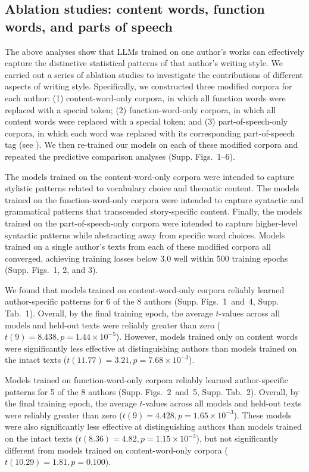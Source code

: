 \documentclass{llmxive}
\providecommand{\crossentropyContent}{{1}}
\providecommand{\crossentropyFunction}{{2}}
\providecommand{\crossentropyPOS}{{3}}
\providecommand{\ttestsContent}{{4}}
\providecommand{\ttestsFunction}{{5}}
\providecommand{\ttestsPOS}{{6}}
\providecommand{\authortableContent}{{1}}
\providecommand{\authortableFunction}{{2}}
\begin{document}
\subsection{Ablation studies: content words, function words, and parts of speech}

The above analyses show that LLMs trained on one author's works can effectively
capture the distinctive statistical patterns of that author's writing style. We
carried out a series of ablation studies to investigate the contributions of
different aspects of writing style. Specifically, we constructed three modified
corpora for each author: (1) content-word-only corpora, in which all function
words were replaced with a special token; (2) function-word-only corpora, in
which all content words were replaced with a special token; and (3)
part-of-speech-only corpora, in which each word was replaced with its
corresponding part-of-speech tag (see ). We then
re-trained our models on each of these modified corpora and repeated the
predictive comparison analyses (Supp. Figs.~\crossentropyContent--\ttestsPOS).

The models trained on the content-word-only corpora were intended to capture
stylistic patterns related to vocabulary choice and thematic content. The
models trained on the function-word-only corpora were intended to capture
syntactic and grammatical patterns that transcended story-specific content.
Finally, the models trained on the part-of-speech-only corpora were intended to
capture higher-level syntactic patterns while abstracting away from specific
word choices. Models trained on a single author's texts from each of these
modified corpora all converged, achieving training losses below 3.0 well within
500 training epochs (Supp. Figs.~\crossentropyContent, \crossentropyFunction,
and \crossentropyPOS).

We found that models trained on content-word-only corpora reliably learned
author-specific patterns for 6 of the 8 authors (Supp.
Figs.~\crossentropyContent~and~\ttestsContent, Supp.
Tab.~\authortableContent). Overall, by the final training epoch, the average
$t$-values across all models and held-out texts were reliably greater than zero
($t(9) = 8.438, p = 1.44 \times 10^{-5}$). However, models trained only on
content words were significantly less effective at distinguishing authors than
models trained on the intact texts ($t(11.77) = 3.21, p = 7.68 \times
10^{-3}$).

Models trained on function-word-only corpora reliably learned author-specific
patterns for 5 of the 8 authors (Supp.
Figs.~\crossentropyFunction~and~\ttestsFunction, Supp.
Tab.~\authortableFunction). Overall, by the final training epoch, the average
$t$-values across all models and held-out texts were reliably greater than zero
($t(9) = 4.428, p = 1.65 \times 10^{-3}$). These models were also significantly
less effective at distinguishing authors than models trained on the intact
texts ($t(8.36) = 4.82, p = 1.15 \times 10^{-3}$), but not significantly
different from models trained on content-word-only corpora ($t(10.29) = 1.81, p
= 0.100$).
\end{document}
